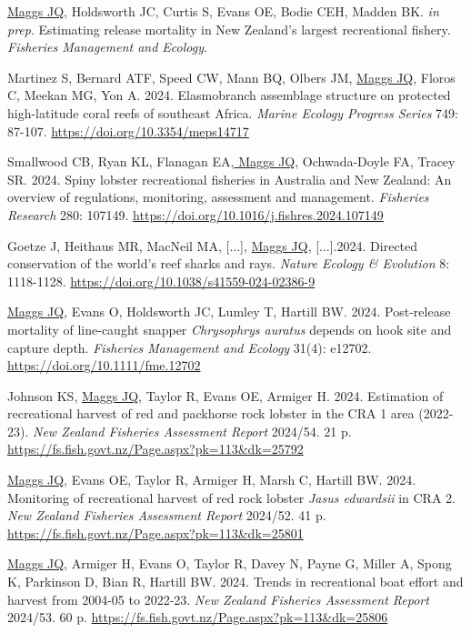 \documentclass[10pt,a4paper]{article}
\begin{document}
\begin{hangparas}{1.5em}{1}

\underline{Maggs JQ}, Holdsworth JC, Curtis S, Evans OE, Bodie CEH, Madden BK. \textit{in prep}. Estimating release mortality in New Zealand’s largest recreational fishery. \textit{Fisheries Management and Ecology}.

Martinez S, Bernard ATF, Speed CW, Mann BQ, Olbers JM, \underline{ Maggs JQ}, Floros C, Meekan MG, Yon A. 2024. Elasmobranch assemblage structure on protected high-latitude coral reefs of southeast Africa. \textit{Marine Ecology Progress Series} 749: 87-107. \url{https://doi.org/10.3354/meps14717}

Smallwood CB, Ryan KL, Flanagan EA,\underline{ Maggs JQ}, Ochwada-Doyle FA, Tracey SR. 2024. Spiny lobster recreational fisheries in Australia and New Zealand: An overview of regulations, monitoring, assessment and management. \textit{Fisheries Research} 280: 107149. \url{https://doi.org/10.1016/j.fishres.2024.107149}

Goetze J, Heithaus MR, MacNeil MA, [...], \underline{Maggs JQ}, [...].2024. Directed conservation of the world’s reef sharks and rays. \textit{Nature Ecology \& Evolution} 8: 1118-1128. \url{https://doi.org/10.1038/s41559-024-02386-9}

\underline{Maggs JQ},  Evans O, Holdsworth JC, Lumley T, Hartill BW. 2024. Post-release mortality of line-caught snapper \textit{Chrysophrys auratus} depends on hook site and capture depth. \textit{Fisheries Management and Ecology} 31(4): e12702. \url{https://doi.org/10.1111/fme.12702}

Johnson KS, \underline{Maggs JQ}, Taylor R, Evans OE, Armiger H. 2024. Estimation of recreational harvest of red and packhorse rock lobster in the CRA 1 area (2022-23). \textit{New Zealand Fisheries Assessment Report} 2024/54. 21 p. \url{https://fs.fish.govt.nz/Page.aspx?pk=113&dk=25792}

\underline{Maggs JQ}, Evans OE, Taylor R, Armiger H, Marsh C, Hartill BW. 2024. Monitoring of recreational harvest of red rock lobster \textit{Jasus edwardsii} in CRA 2. \textit{New Zealand Fisheries Assessment Report}  2024/52. 41 p. \url{https://fs.fish.govt.nz/Page.aspx?pk=113&dk=25801}

\underline{Maggs JQ}, Armiger H, Evans O, Taylor R, Davey N, Payne G, Miller A, Spong K, Parkinson D, Bian R, Hartill BW. 2024. Trends in recreational boat effort and harvest from 2004-05 to 2022-23. \textit{New Zealand Fisheries Assessment Report} 2024/53. 60 p. \url{https://fs.fish.govt.nz/Page.aspx?pk=113&dk=25806}


\end{hangparas}
\end{document}
